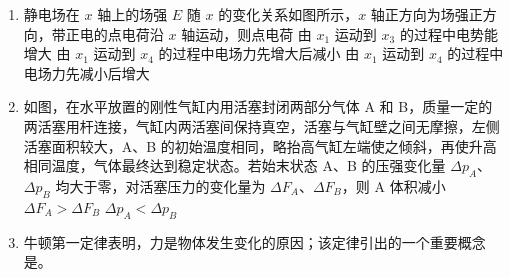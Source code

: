 \documentclass[\gkver]{gaokaozhenti}
\begin{document}
\begin{enumerate}
{由 $\frac{\Delta U_{1}}{\Delta I} = R$、$\frac{\Delta U_{2}}{\Delta I} = r$，且题中已知 $R > r$，可得 $\Delta U_{1} > \Delta U_{2}$，选项（D）正确。
}

\item
静电场在 $x$ 轴上的场强 $E$ 随 $x$ 的变化关系如图所示，$x$ 轴正方向为场强正方向，带正电的点电荷沿 $x$ 轴运动，则点电荷
\onepicture[align=right, w=6.39cm]{}
{由 $x_{1}$ 运动到 $x_{3}$ 的过程中电势能增大}
{由 $x_{1}$ 运动到 $x_{4}$ 的过程中电场力先增大后减小}
{由 $x_{1}$ 运动到 $x_{4}$ 的过程中电场力先减小后增大}

\item
如图，在水平放置的刚性气缸内用活塞封闭两部分气体 A 和 B，质量一定的两活塞用杆连接，气缸内两活塞间保持真空，活塞与气缸壁之间无摩擦，左侧活塞面积较大，A、B 的初始温度相同，略抬高气缸左端使之倾斜，再使升高相同温度，气体最终达到稳定状态。若始末状态 A、B 的压强变化量 $\Delta p_{A}$、$\Delta p_{B}$ 均大于零，对活塞压力的变化量为 $\Delta F_{A}$、$\Delta F_{B}$，则
\onepicture[align=right, w=5.92cm]{}
{A 体积减小}
{$\Delta F_{A} > \Delta F_{B}$}
{$\Delta p_{A} < \Delta p_{B}$}

\item
牛顿第一定律表明，力是物体发生变化的原因；该定律引出的一个重要概念是。


\end{enumerate}
\end{document}
